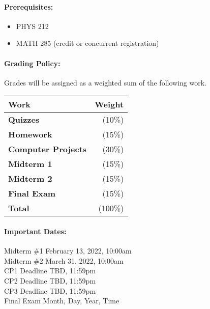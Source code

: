\documentclass[11pt, a4paper]{article}
\begin{document}
\paragraph{Prerequisites:}
\begin{itemize}
\item PHYS 212
\item MATH 285 (credit or concurrent registration)
\end{itemize}

\paragraph{Grading Policy:} Grades will be assigned as a weighted sum of the following work.

\begin{table}[h]
\begin{tabularx}{\textwidth}{Xr}
\textbf{Work} & \textbf{Weight}\\
\hline
\textbf{Quizzes} & (10\%) \\
\textbf{Homework} & (15\%) \\
\textbf{Computer Projects} & (30\%) \\
\textbf{Midterm 1} & (15\%) \\
\textbf{Midterm 2} & (15\%) \\
\textbf{Final Exam} & (15\%) \\
\hline
\textbf{Total} & (100\%) \\
\end{tabularx}
\end{table}

\paragraph{Important Dates:}
\begin{center} \begin{minipage}{3.8in}
\begin{flushleft}
Midterm \#1       \dotfill February 13, 2022, 10:00am  \\
Midterm \#2       \dotfill March 31, 2022, 10:00am  \\
CP1 Deadline      \dotfill TBD, 11:59pm  \\
CP2 Deadline      \dotfill TBD, 11:59pm  \\
CP3 Deadline      \dotfill TBD, 11:59pm  \\
Final Exam        \dotfill Month, Day, Year, Time  \\
\end{flushleft}
\end{minipage}
\end{center}
\end{document}

